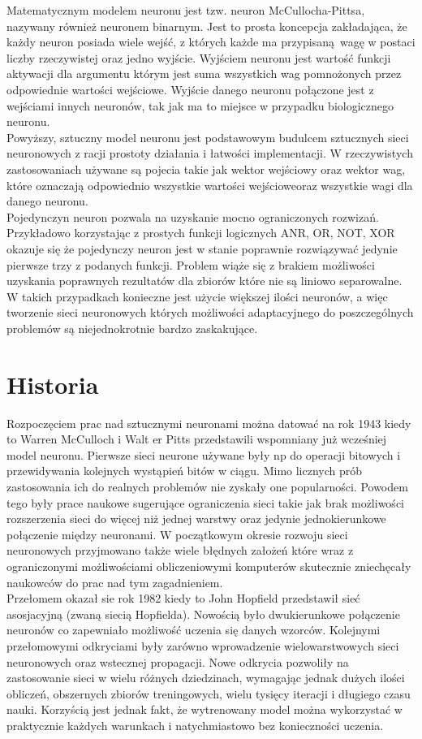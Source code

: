 Matematycznym modelem neuronu jest tzw. neuron McCullocha-Pittsa, nazywany
również neuronem binarnym. Jest to prosta koncepcja zakładająca, że każdy neuron
posiada wiele wejść, z których każde ma przypisaną wagę w postaci liczby
rzeczywistej oraz jedno wyjście. Wyjściem neuronu jest wartość funkcji aktywacji
dla argumentu którym jest suma wszystkich wag pomnożonych przez odpowiednie
wartości wejściowe. Wyjście danego neuronu połączone jest z wejściami innych
neuronów, tak jak ma to miejsce w przypadku biologicznego neuronu. \\
Powyższy, sztuczny model neuronu jest podstawowym budulcem sztucznych sieci
neuronowych z racji prostoty działania i łatwości implementacji.
W rzeczywistych zastosowaniach używane są pojecia takie jak wektor wejściowy
oraz wektor wag, które oznaczają odpowiednio wszystkie wartości wejścioweoraz
wszystkie wagi dla danego neuronu. \\
Pojedynczyn neuron pozwala na uzyskanie mocno ograniczonych rozwizań. Przykładowo
korzystając z prostych funkcji logicznych ANR, OR, NOT, XOR okazuje się że
pojedynczy neuron jest w stanie poprawnie rozwiązywać jedynie pierwsze trzy z
podanych funkcji. Problem wiąże się z brakiem możliwości uzyskania poprawnych
rezultatów dla zbiorów które nie są liniowo separowalne. W takich przypadkach
konieczne jest użycie większej ilości neuronów, a więc tworzenie sieci neuronowych
których możliwości adaptacyjnego do poszczególnych problemów są niejednokrotnie
bardzo zaskakujące.


\section{Historia}

Rozpoczęciem prac nad sztucznymi neuronami można datować na rok 1943 kiedy to
Warren McCulloch i Walt er Pitts przedstawili wspomniany już wcześniej model
neuronu. Pierwsze sieci neurone używane były np do operacji bitowych i
przewidywania kolejnych wystąpień bitów w ciągu. Mimo licznych prób zastosowania
ich do realnych problemów nie zyskały one popularności. Powodem tego były prace
naukowe sugerujące ograniczenia sieci takie jak brak możliwości rozszerzenia sieci
do więcej niż jednej warstwy oraz jedynie jednokierunkowe połączenie między
neuronami. W początkowym okresie rozwoju sieci neuronowych przyjmowano także wiele
błędnych założeń które wraz z ograniczonymi możliwościami obliczeniowymi komputerów
skutecznie zniechęcały naukowców do prac nad tym zagadnieniem. \\
Przełomem okazał sie rok 1982 kiedy to John Hopfield przedstawił sieć asosjacyjną
(zwaną siecią Hopfielda). Nowością było dwukierunkowe połączenie neuronów co
zapewniało możliwość uczenia się danych wzorców. Kolejnymi przełomowymi odkryciami
były zarówno wprowadzenie wielowarstwowych sieci neuronowych oraz wstecznej
propagacji. Nowe odkrycia pozwoliły na zastosowanie sieci w wielu różnych
dziedzinach, wymagając jednak dużych ilości obliczeń, obszernych zbiorów
treningowych, wielu tysięcy iteracji i długiego czasu nauki. Korzyścią jest jednak
fakt, że wytrenowany model można wykorzystać w praktycznie każdych warunkach
i natychmiastowo bez konieczności uczenia.
